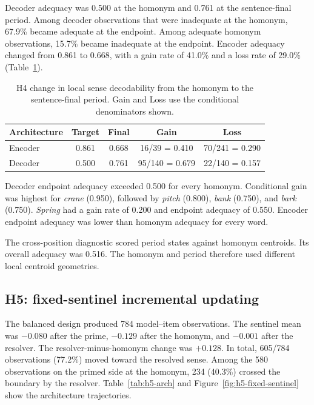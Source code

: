 \documentclass[conference]{IEEEtran}
\newcommand{\resultstableformat}{%
  \footnotesize
  \renewcommand{\arraystretch}{1.12}%
  \setlength{\extrarowheight}{0.7pt}%
}
\begin{document}
Decoder adequacy was 0.500 at the homonym and 0.761 at the sentence-final
period. Among decoder observations that were inadequate at the homonym, 67.9\%
became adequate at the endpoint. Among adequate homonym observations, 15.7\%
became inadequate at the endpoint. Encoder adequacy changed from 0.861 to
0.668, with a gain rate of 41.0\% and a loss rate of 29.0\%
(Table~\ref{tab:h4-transitions}).

\begin{table}[!t]
\centering
\resultstableformat
\setlength{\tabcolsep}{3.5pt}
\renewcommand{\arraystretch}{1.15}
\caption{H4 change in local sense decodability from the homonym to the
sentence-final period. Gain and Loss use the conditional denominators shown.}
\label{tab:h4-transitions}
\begin{tabular}{@{}lcccc@{}}
\hline
Architecture & Target & Final & Gain & Loss \\
\hline
Encoder & 0.861 & 0.668 & 16/39 = 0.410 & 70/241 = 0.290 \\
Decoder & 0.500 & 0.761 & 95/140 = 0.679 & 22/140 = 0.157 \\
\hline
\end{tabular}
\end{table}

Decoder endpoint adequacy exceeded 0.500 for every homonym. Conditional gain
was highest for \emph{crane} (0.950), followed by \emph{pitch} (0.800),
\emph{bank} (0.750), and \emph{bark} (0.750). \emph{Spring} had a gain rate of
0.200 and endpoint adequacy of 0.550. Encoder endpoint adequacy was lower than
homonym adequacy for every word.

The cross-position diagnostic scored period states against homonym centroids.
Its overall adequacy was 0.516. The homonym and period therefore used different
local centroid geometries.

\subsection{H5: fixed-sentinel incremental updating}
\label{sec:results-h5}

The balanced design produced 784 model--item observations. The sentinel mean
was $-0.080$ after the prime, $-0.129$ after the homonym, and $-0.001$ after
the resolver. The resolver-minus-homonym change was $+0.128$. In total,
605/784 observations (77.2\%) moved toward the resolved sense. Among the 580
observations on the primed side at the homonym, 234 (40.3\%) crossed the
boundary by the resolver. Table~\ref{tab:h5-arch} and
Figure~\ref{fig:h5-fixed-sentinel} show the architecture trajectories.
\end{document}
